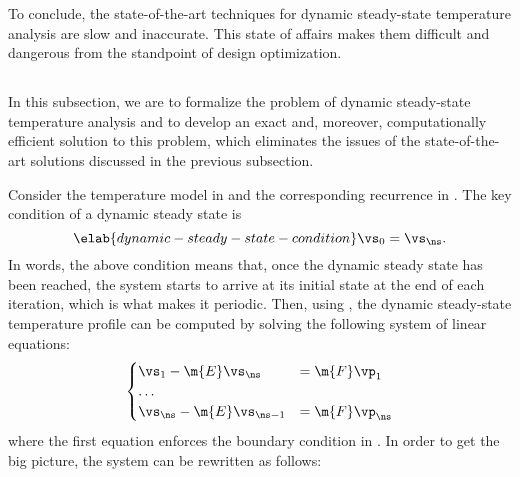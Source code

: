 To conclude, the state-of-the-art techniques for dynamic steady-state
temperature analysis are slow and inaccurate. This state of affairs makes them
difficult and dangerous from the standpoint of design optimization.

\subsection{\solutiontitle}

In this subsection, we are to formalize the problem of dynamic steady-state
temperature analysis and to develop an exact and, moreover, computationally
efficient solution to this problem, which eliminates the issues of the
state-of-the-art solutions discussed in the previous subsection.

Consider the temperature model in  and the corresponding
recurrence in . The key condition of a dynamic
steady state is
\begin{equation} \elab{dynamic-steady-state-condition}
  \vs_0 = \vs_\ns.
\end{equation}
In words, the above condition means that, once the dynamic steady state has been
reached, the system starts to arrive at its initial state at the end of each
iteration, which is what makes it periodic. Then, using
, the dynamic steady-state temperature profile
can be computed by solving the following system of linear equations:
\[
  \begin{cases}
    \vs_1 - \m{E} \vs_\ns & = \m{F} \vp_1 \\
    \dots \\
    \vs_\ns - \m{E} \vs_{\ns - 1} & = \m{F} \vp_\ns
  \end{cases}
\]
where the first equation enforces the boundary condition in
. In order to get the big picture, the
system can be rewritten as follows:
